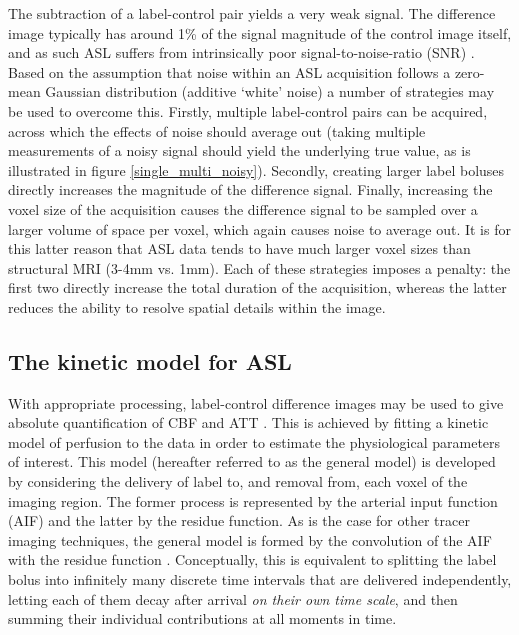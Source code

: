 The subtraction of a label-control pair yields a very weak signal. The difference image typically has around 1\% of the signal magnitude of the control image itself, and as such ASL suffers from intrinsically poor signal-to-noise-ratio (SNR) \cite{Li2018}. Based on the assumption that noise within an ASL acquisition follows a zero-mean Gaussian distribution (additive `white' noise) a number of strategies may be used to overcome this. Firstly, multiple label-control pairs can be acquired, across which the effects of noise should average out (taking multiple measurements of a noisy signal should yield the underlying true value, as is illustrated in figure \ref{single_multi_noisy}). Secondly, creating larger label boluses directly increases the magnitude of the difference signal. Finally, increasing the voxel size of the acquisition causes the difference signal to be sampled over a larger volume of space per voxel, which again causes noise to average out. It is for this latter reason that ASL data tends to have much larger voxel sizes than structural MRI (3-4mm vs. 1mm). Each of these strategies imposes a penalty: the first two directly increase the total duration of the acquisition, whereas the latter reduces the ability to resolve spatial details within the image. 


\subsection{The kinetic model for ASL} 
\label{asl_kinetic_section}

With appropriate processing, label-control difference images may be used to give absolute quantification of CBF and ATT \cite{asl_primer}. This is achieved by fitting a kinetic model of perfusion to the data in order to estimate the physiological parameters of interest. This model (hereafter referred to as the general model) is developed by considering the delivery of label to, and removal from, each voxel of the imaging region. The former process is represented by the arterial input function (AIF) and the latter by the residue function. As is the case for other tracer imaging techniques, the general model is formed by the convolution of the AIF with the residue function \cite{Buxton1998}. Conceptually, this is equivalent to splitting the label bolus into infinitely many discrete time intervals that are delivered independently, letting each of them decay after arrival \textit{on their own time scale}, and then summing their individual contributions at all moments in time. 

